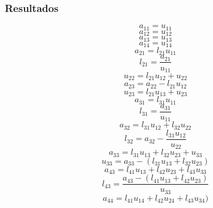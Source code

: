 \subsubsection{Resultados}
\begin{multicols}{2}
\begin{displaymath}a_{11}=u_{11}\end{displaymath}
\begin{displaymath}a_{12}=u_{12}\end{displaymath}
\begin{displaymath}a_{13}=u_{13}\end{displaymath}
\begin{displaymath}a_{14}=u_{14}\end{displaymath}
\begin{displaymath}a_{21}=l_{21}u_{11}\end{displaymath}
\begin{displaymath}l_{21}=\frac{a_{21}}{u_{11}}\end{displaymath}
\begin{displaymath}u_{22}=l_{21}u_{12}+u_{22}\end{displaymath}
\begin{displaymath}a_{23}=a_{22}-l_{21}u_{12}\end{displaymath}
\begin{displaymath}u_{23}=l_{21}u_{13}+u_{23}\end{displaymath}
\begin{displaymath}a_{31}=l_{31}u_{11}\end{displaymath}
\begin{displaymath}l_{31}=\frac{a_{31}}{u_{11}}\end{displaymath}
\begin{displaymath}a_{32}=l_{31}u_{12}+l_{32}u_{22}\end{displaymath}
\begin{displaymath}l_{32}=a_{32}-\frac{l_{31}u_{12}}{u_{22}}\end{displaymath}
\begin{displaymath}a_{33}=l_{31}u_{13}+l_{32}u_{23}+u_{33}\end{displaymath}
\begin{displaymath}u_{33}=a_{33}-(l_{31}u_{13}+l_{32}u_{23})\end{displaymath}
\begin{displaymath}a_{43}=l_{41}u_{13}+l_{42}u_{23}+l_{43}u_{33}\end{displaymath}
\begin{displaymath}l_{43}=\frac{a_{43}-(l_{41}u_{13}+l_{42}u_{23})}{u_{33}}\end{displaymath}
\begin{displaymath}a_{44}=l_{41}u_{14}+l_{42}u_{24}+l_{43}u_{34})\end{displaymath}
\end{multicols}
